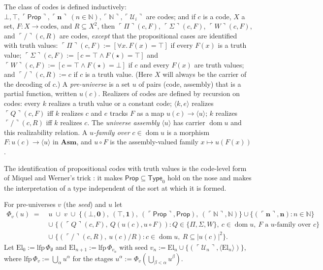 \documentclass[10pt]{article}
\newcommand{\N}{\mathbb{N}}
\newcommand{\Asm}{\mathbf{Asm}}
\newcommand{\Prop}{\mathsf{Prop}}
\newcommand{\Type}{\mathsf{Type}}
\newcommand{\code}[1]{\ulcorner #1\urcorner}
\newcommand{\El}{\mathrm{El}}
\newcommand{\dom}{\operatorname{dom}}
\newcommand{\U}{\mathcal{U}}
\begin{document}
\begin{definition}\label{def:codes}
The class of codes is defined inductively: $\bot,\top,\code\Prop,
\code{\mathbf n}\ (n\in\N),\code\N,\code{\U_i}$ are codes; and if $c$ is a code,
$X$ a set, $F:X\to\text{codes}$, and $R\subseteq X^2$, then
$\code\Pi(c,F)$, $\code\Sigma(c,F)$, $\code W(c,F)$, and $\code{/}(c,R)$
are codes, \emph{except} that the propositional cases are identified with
truth values: $\code\Pi(c,F):=[\forall x.\,F(x)=\top]$ if every $F(x)$ is
a truth value; $\code\Sigma(c,F):=[c=\top\wedge F(\star)=\top]$ and
$\code W(c,F):=[c=\top\wedge F(\star)=\bot]$ if $c$ and every $F(x)$ are
truth values; and $\code/(c,R):=c$ if $c$ is a truth value. (Here $X$ will
always be the carrier of the decoding of $c$.)
A \emph{pre-universe} is a set $u$ of pairs (code, assembly) that is a
partial function, written $u(c)$. Realizers of codes are defined by
recursion on codes: every $k$ realizes a truth value or a constant code;
$\langle k,e\rangle$ realizes $\code Q(c,F)$ iff $k$ realizes $c$ and $e$
tracks $F$ as a map $u(c)\to\langle u\rangle$; $k$ realizes $\code/(c,R)$
iff $k$ realizes $c$. The \emph{universe assembly} $\langle u\rangle$ has
carrier $\dom u$ and this realizability relation. A \emph{$u$-family over
$c\in\dom u$} is a morphism $F:u(c)\to\langle u\rangle$ in $\Asm$, and
$u\circ F$ is the assembly-valued family $x\mapsto u(F(x))$.
\end{definition}

The identification of propositional codes with truth values is the
code-level form of Miquel and Werner's trick \cite{miquelwerner02}: it makes
$\Prop\subseteq\Type_0$ hold on the nose and makes the interpretation of a
type independent of the sort at which it is formed.

\begin{definition}
For pre-universes $v$ (the \emph{seed}) and $u$ let
\begin{align*}
\Phi_v(u) \;=\;& u\;\cup\;v\;\cup\;
  \{(\bot,\mathbf 0),\ (\top,\mathbf 1),\ (\code\Prop,\Prop),\ (\code\N,\N)\}
  \cup\{(\code{\mathbf n},\mathbf n):n\in\N\}\\
&\cup\;\{(\code{Q}(c,F),\ Q(u(c),u\circ F)) : Q\in\{\Pi,\Sigma,W\},\
      c\in\dom u,\ F\text{ a $u$-family over }c\}\\
&\cup\;\{(\code/(c,R),\ u(c)/R) : c\in\dom u,\ R\subseteq|u(c)|^2\}.
\end{align*}
Let $\El_0:=\mathrm{lfp}\,\Phi_\emptyset$ and
$\El_{n+1}:=\mathrm{lfp}\,\Phi_{v_n}$ with seed
$v_n:=\El_n\cup\{(\code{\U_n},\langle\El_n\rangle)\}$, where
$\mathrm{lfp}\,\Phi_v:=\bigcup_\alpha u^\alpha$ for the stages
$u^\alpha:=\Phi_v(\bigcup_{\beta<\alpha}u^\beta)$.
\end{definition}
\end{document}
